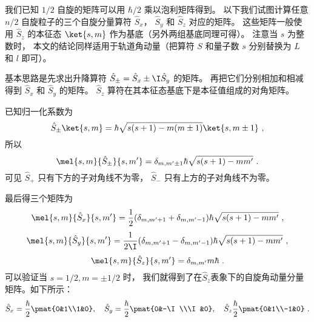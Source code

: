 

我们已知 $1/2$ 自旋的矩阵可以用 $\hbar/2$ 乘以泡利矩阵得到。 以下我们试图计算任意 $n/2$ 自旋粒子的三个自旋分量算符 $\hat S_x$， $\hat S_y$ 和 $\hat S_z$ 对应的矩阵。 这些矩阵一般使用 $\hat S_z$ 的本征态 $\ket{s, m}$ 作为基底（另外两组基底同理可得）。 注意当 $s$ 为整数时， 本文的结论同样适用于轨道角动量（把算符 $S$ 和量子数 $s$ 分别替换为 $L$ 和 $l$ 即可）。

基本思路是先求出升降算符 $\hat S_\pm = \hat S_x \pm \I \hat S_y$ 的矩阵。 再把它们分别相加和相减得到 $\hat S_x$ 和 $\hat S_y$ 的矩阵。 $\hat S_z$ 算符在其本征态基底下是本征值组成的对角矩阵。

已知归一化系数为
\begin{equation}
\hat S_\pm \ket{s,m} = \hbar \sqrt{s(s + 1) - m(m \pm 1)} \ket{s,m\pm1}~,
\end{equation}
所以
\begin{equation}
\mel{s,m}{\hat S_\pm}{s,m'} = \delta_{m, m'\pm1} \hbar \sqrt{s(s + 1) - mm'}~.
\end{equation}
可见 $\hat S_+$ 只有下方的子对角线不为零， $\hat S_-$ 只有上方的子对角线不为零。

最后得三个矩阵为
\begin{equation}
\mel{s,m}{\hat S_x}{s,m'} = \frac12(\delta_{m, m'+1} + \delta_{m, m'-1})\hbar \sqrt{s(s + 1) - mm'} ~,
\end{equation}
\begin{equation}
\mel{s,m}{\hat S_y}{s,m'} = \frac{1}{2\I}(\delta_{m, m'+1} - \delta_{m, m'-1}) \hbar \sqrt{s(s + 1) - mm'}~,
\end{equation}
\begin{equation}
\mel{s,m}{\hat S_z}{s,m'} = \delta_{m,m'} m\hbar ~.
\end{equation}
可以验证当 $s = 1/2, m = \pm1/2$ 时， 我们就得到了在$\hat S_z$表象下的自旋角动量分量矩阵。如下所示：
\begin{equation}
\hat S_x=\frac{\hbar}{2}\pmat{0&1\\1&0},\quad\hat S_y=\frac{\hbar}{2}\pmat{0&-\I\\\I&0},\quad\hat S_z\frac{\hbar}{2}\pmat{0&1\\-1&0}~.
\end{equation}

